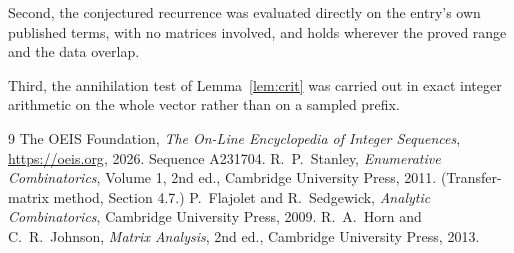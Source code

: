 \documentclass[11pt,a4paper]{article}
\theoremstyle{plain}
\theoremstyle{definition}
\begin{document}
Second, the conjectured recurrence was evaluated directly on the entry's own published terms,
with no matrices involved, and holds wherever the proved range and the data overlap.

Third, the annihilation test of Lemma~\ref{lem:crit} was carried out in exact integer
arithmetic on the whole vector rather than on a sampled prefix.

\begin{thebibliography}{9}
 The OEIS Foundation, \emph{The On-Line Encyclopedia of Integer
Sequences}, \url{https://oeis.org}, 2026. Sequence A231704.
 R.~P.~Stanley, \emph{Enumerative Combinatorics}, Volume 1, 2nd ed.,
Cambridge University Press, 2011. (Transfer-matrix method, Section 4.7.)
 P.~Flajolet and R.~Sedgewick, \emph{Analytic Combinatorics}, Cambridge
University Press, 2009.
 R.~A.~Horn and C.~R.~Johnson, \emph{Matrix Analysis}, 2nd ed., Cambridge
University Press, 2013.
\end{thebibliography}
\end{document}
